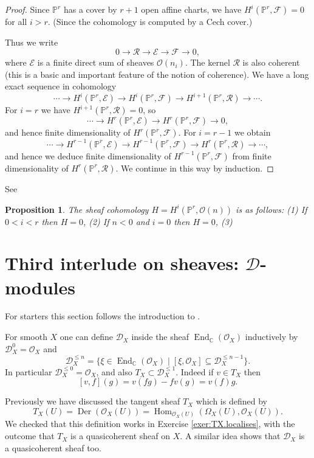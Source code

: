 \documentclass[12pt]{article}
\theoremstyle{plain}
\newtheorem{prop}[thm]{Proposition}
\theoremstyle{definition}
\numberwithin{equation}{section}
\DeclareMathOperator{\Der}{Der}
\DeclareMathOperator{\en}{End}
\DeclareMathOperator{\Hom}{Hom}
\newcommand{\Om}{\Omega}
\newcommand{\C}{\mathbb{C}}
\newcommand{\bbP}{\mathbb{P}}
\newcommand{\CD}{\mathcal{D}}
\newcommand{\CE}{\mathcal{E}}
\newcommand{\CF}{\mathcal{F}}
\newcommand{\CR}{\mathcal{R}}
\newcommand{\OO}{\mathcal{O}}
\begin{document}
\begin{proof}
Since $\bbP^r$ has a cover by $r+1$ open affine charts, we have $H^i(\bbP^r, \CF) = 0$ for all $i > r$. (Since the cohomology is computed by a Cech cover.)

Thus we write
\[
0 \rightarrow \CR \rightarrow \CE \rightarrow \CF \rightarrow 0,
\]
where $\CE$ is a finite direct sum of sheaves $\OO(n_i)$. The kernel $\CR$ is also coherent (this is a basic and important feature of the notion of coherence). We have a long exact sequence in cohomology
\[
\cdots \rightarrow H^{i}(\bbP^r, \CE) \rightarrow H^{i}(\bbP^r, \CF) \rightarrow H^{i+1}(\bbP^r, \CR) \rightarrow \cdots.
\]
For $i = r$ we have $H^{i+1}(\bbP^r, \CR) = 0$, so
\[
\cdots \rightarrow H^{r}(\bbP^r, \CE) \rightarrow H^{r}(\bbP^r, \CF) \rightarrow 0,
\]
and hence finite dimensionality of $H^{r}(\bbP^r, \CF)$. For $i=r-1$ we obtain
\[
\cdots \rightarrow H^{r-1}(\bbP^r, \CE) \rightarrow H^{r-1}(\bbP^r, \CF) \rightarrow H^{r}(\bbP^r, \CR) \rightarrow \cdots,
\]
and hence we deduce finite dimensionality of $H^{r-1}(\bbP^r, \CF)$ from finite dimensionality of $H^{r}(\bbP^r, \CR)$. We continue in this way by induction.
\end{proof}




See {\cite[III, Theorem 5.1]{Hartshorne}}
\begin{prop}\label{prop:O(n).finite.coho}
The sheaf cohomology $H = H^i(\bbP^r, \OO(n))$ is as follows: (1) If $0 < i < r$ then $H = 0$, (2) If $n < 0$ and $i = 0$ then $H = 0$, (3)
\end{prop}




\section{Third interlude on sheaves: $\CD$-modules}





For starters this section follows the introduction to {\cite{HTT}}.


For smooth $X$ one can define $\CD_X$ inside the sheaf $\en_\C(\OO_X)$ inductively by $\CD_X^0 = \OO_X$ and
\[
\CD_X^{\leq n} = \{\xi \in \en_\C(\OO_X) \mid [\xi, \OO_X] \subseteq \CD_X^{\leq n-1}\}.
\]
In particular $\CD_X^{\leq 0} = \OO_X$, and also $T_X \subset \CD_X^{\leq 1}$. Indeed if $v \in T_X$ then
\[
[v, f](g) = v(fg) - fv(g) = v(f) g.
\]




Previously we have discussed the tangent sheaf $T_X$ which is defined by
\[
T_X(U) = \Der(\OO_X(U)) = \Hom_{\OO_X(U)}(\Om_X(U), \OO_X(U)).
\]
We checked that this definition works in Exercise \ref{exer:TX.localises}, with the outcome that $T_X$ is a quasicoherent sheaf on $X$. A similar idea shows that $\CD_X$ is a quasicoherent sheaf too.
\end{document}
